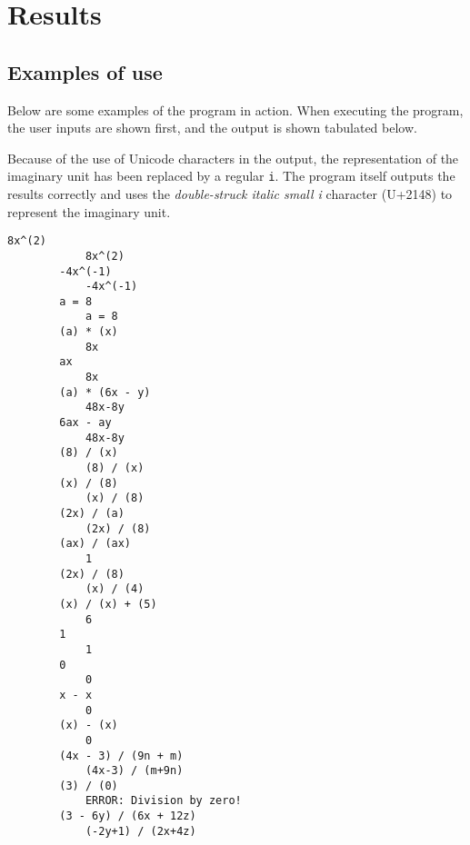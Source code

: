 \section{Results}\label{sec:results}

\subsection{Examples of use}\label{subsec:examples-of-use}

Below are some examples of the program in action. When executing the program, the user inputs are shown first, and the output is shown tabulated below.

Because of the use of Unicode characters in the output, the representation of the imaginary unit has been replaced by a regular \verb|i|. The program itself outputs the results correctly and uses the \textit{double-struck italic small i} character (U+2148) to represent the imaginary unit.

\begin{minipage}{\linewidth}
    \begin{lstlisting}[caption={Example of use of the program simplifying expressions.},label={lst:example-simplify}]
        8x^(2)
            8x^(2)
        -4x^(-1)
            -4x^(-1)
        a = 8
            a = 8
        (a) * (x)
            8x
        ax
            8x
        (a) * (6x - y)
            48x-8y
        6ax - ay
            48x-8y
        (8) / (x)
            (8) / (x)
        (x) / (8)
            (x) / (8)
        (2x) / (a)
            (2x) / (8)
        (ax) / (ax)
            1
        (2x) / (8)
            (x) / (4)
        (x) / (x) + (5)
            6
        1
            1
        0
            0
        x - x
            0
        (x) - (x)
            0
        (4x - 3) / (9n + m)
            (4x-3) / (m+9n)
        (3) / (0)
            ERROR: Division by zero!
        (3 - 6y) / (6x + 12z)
            (-2y+1) / (2x+4z)
    \end{lstlisting}
\end{minipage}

